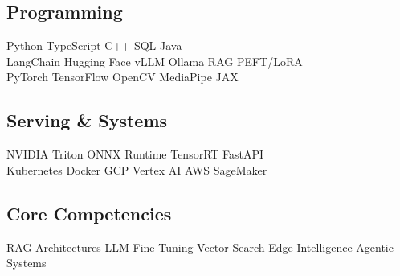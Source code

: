 \documentclass[../main.tex]{subfiles}
\begin{document}
\subsection{Programming}
Python \textbullet{} TypeScript \textbullet{} C++ \textbullet{} SQL \textbullet{} Java \\
LangChain \textbullet{} Hugging Face \textbullet{} vLLM \textbullet{} Ollama \textbullet{} RAG \textbullet{} PEFT/LoRA \\
PyTorch \textbullet{} TensorFlow \textbullet{} OpenCV \textbullet{} MediaPipe \textbullet{} JAX \\

\subsection{Serving \& Systems}
NVIDIA Triton \textbullet{} ONNX Runtime \textbullet{} TensorRT \textbullet{} FastAPI \\
Kubernetes \textbullet{} Docker \textbullet{} GCP Vertex AI \textbullet{} AWS SageMaker \\

\subsection{Core Competencies}
RAG Architectures \textbullet{} LLM Fine-Tuning \textbullet{} Vector Search \textbullet{} Edge Intelligence \textbullet{} Agentic Systems
\end{document}
